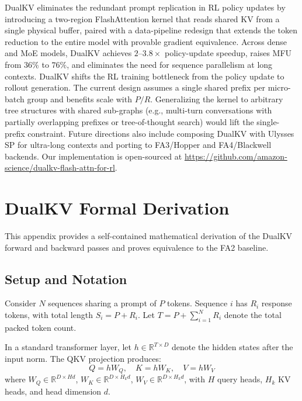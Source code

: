 \documentclass{article}
\begin{document}
DualKV eliminates the redundant prompt replication in RL policy updates by introducing a two-region FlashAttention kernel that reads shared KV from a single physical buffer, paired with a data-pipeline redesign that extends the token reduction to the entire model with provable gradient equivalence. Across dense and MoE models, DualKV achieves $2$--$3.8\times$ policy-update speedup, raises MFU from $36\%$ to $76\%$, and eliminates the need for sequence parallelism at long contexts. DualKV shifts the RL training bottleneck from the policy update to rollout generation. The current design assumes a single shared prefix per micro-batch group and benefits scale with $P/R$. Generalizing the kernel to arbitrary tree structures with shared sub-graphs (e.g., multi-turn conversations with partially overlapping prefixes or tree-of-thought search) would lift the single-prefix constraint. Future directions also include composing DualKV with Ulysses SP for ultra-long contexts and porting to FA3/Hopper and FA4/Blackwell backends. Our implementation is open-sourced at \textcolor{blue}{\url{https://github.com/amazon-science/dualkv-flash-attn-for-rl}}.





\appendix

\section{DualKV Formal Derivation}
\label{app:dualkv-math}

This appendix provides a self-contained mathematical derivation of the DualKV forward and backward passes and proves equivalence to the FA2 baseline.

\subsection{Setup and Notation}

Consider $N$ sequences sharing a prompt of $P$ tokens. Sequence $i$ has $R_i$ response tokens, with total length $S_i = P + R_i$. Let $T = P + \sum_{i=1}^N R_i$ denote the total packed token count.

In a standard transformer layer, let $h \in \mathbb{R}^{T \times D}$ denote the hidden states after the input norm. The QKV projection produces:
\begin{equation}
  Q = h W_Q, \quad K = h W_K, \quad V = h W_V
\end{equation}
where $W_Q \in \mathbb{R}^{D \times Hd}$, $W_K \in \mathbb{R}^{D \times H_k d}$, $W_V \in \mathbb{R}^{D \times H_k d}$, with $H$ query heads, $H_k$ KV heads, and head dimension $d$.
\end{document}
